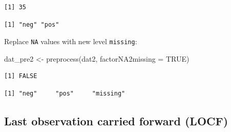 \documentclass[
]{book}
\newenvironment{Shaded}{\begin{snugshade}}{\end{snugshade}}
\newcommand{\AttributeTok}[1]{\textcolor[rgb]{0.77,0.63,0.00}{#1}}
\newcommand{\ConstantTok}[1]{\textcolor[rgb]{0.00,0.00,0.00}{#1}}
\newcommand{\FunctionTok}[1]{\textcolor[rgb]{0.00,0.00,0.00}{#1}}
\newcommand{\NormalTok}[1]{#1}
\newcommand{\OtherTok}[1]{\textcolor[rgb]{0.56,0.35,0.01}{#1}}
\newcommand{\SpecialCharTok}[1]{\textcolor[rgb]{0.00,0.00,0.00}{#1}}
\begin{document}
\begin{verbatim}
[1] 35
\end{verbatim}

\begin{Shaded}
\end{Shaded}

\begin{verbatim}
[1] "neg" "pos"
\end{verbatim}

Replace \texttt{NA} values with new level \texttt{missing}:

\begin{Shaded}
\begin{Highlighting}[]
\NormalTok{dat\_pre2 }\OtherTok{\textless{}{-}} \FunctionTok{preprocess}\NormalTok{(dat2, }\AttributeTok{factorNA2missing =} \ConstantTok{TRUE}\NormalTok{)}
\end{Highlighting}
\end{Shaded}

\begin{Shaded}
\end{Shaded}

\begin{verbatim}
[1] FALSE
\end{verbatim}

\begin{Shaded}
\end{Shaded}

\begin{verbatim}
[1] "neg"     "pos"     "missing"
\end{verbatim}

\hypertarget{last-observation-carried-forward-locf}{%
\subsection{Last observation carried forward (LOCF)}\label{last-observation-carried-forward-locf}}
\end{document}
